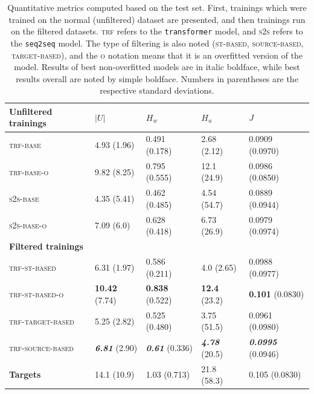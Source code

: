 \documentclass[11pt,a4paper]{article}
\begin{document}
\begin{table}[t!]
	\begin{center}
		\begin{tabular}{lllll}
			
			\bf Unfiltered trainings & \(|U|\) & \(H_w\) & \(H_u\) & \(J\) \\ \hline
			
			\textsc{trf-base} & 4.93 (1.96) & 0.491 (0.178) & 2.68 (2.12) & 0.0909 (0.0970) \\
			\textsc{trf-base-o} & 9.82 (8.25) & 0.795 (0.555) & 12.1 (24.9) & 0.0986 (0.0850) \\
			\textsc{s2s-base} & 4.35 (5.41) & 0.462 (0.485) & 4.54 (54.7) & 0.0889 (0.0944) \\
			\textsc{s2s-base-o} & 7.09 (6.0) & 0.628 (0.418) & 6.73 (26.9) & 0.0979 (0.0974) \\ \hline
			\bf	Filtered trainings  &  &  &  &  \\ \hline
			
			\textsc{trf-st-based} & 6.31 (1.97) & 0.586 (0.211) & 4.0 (2.65) & 0.0988 (0.0977) \\
			\textsc{trf-st-based-o} & {\bf10.42} (7.74) & {\bf0.838} (0.522) & {\bf12.4} (23.2) & {\bf0.101} (0.0830) \\
			\textsc{trf-target-based} & 5.25 (2.82) & 0.525 (0.480) & 3.75 (51.5) & 0.0961 (0.0980) \\
			\textsc{trf-source-based} & \textbf{\textit{6.81}} (2.90) & \textbf{\textit{0.61}} (0.336) & \textbf{\textit{4.78}} (20.5) & \textbf{\textit{0.0995}} (0.0946) \\ \hline
			
			\bf Targets & 14.1 (10.9) & 1.03 (0.713) & 21.8 (58.3) & 0.105 (0.0830) \\ 
		\end{tabular}
	\end{center}
	\caption{\label{table:test_source} Quantitative metrics computed based on the test set. First, trainings which were trained on the normal (unfiltered) dataset are presented, and then trainings run on the filtered datasets. \textsc{trf} refers to the \texttt{transformer} model, and \textsc{s2s} refers to the \texttt{seq2seq} model. The type of filtering is also noted (\textsc{st-based}, \textsc{source-based}, \textsc{target-based}), and the \textsc{o} notation means that it is an overfitted version of the model. Results of best non-overfitted models are in italic boldface, while best results overall are noted by simple boldface. Numbers in parentheses are the respective standard deviations.}
\end{table}
\end{document}

